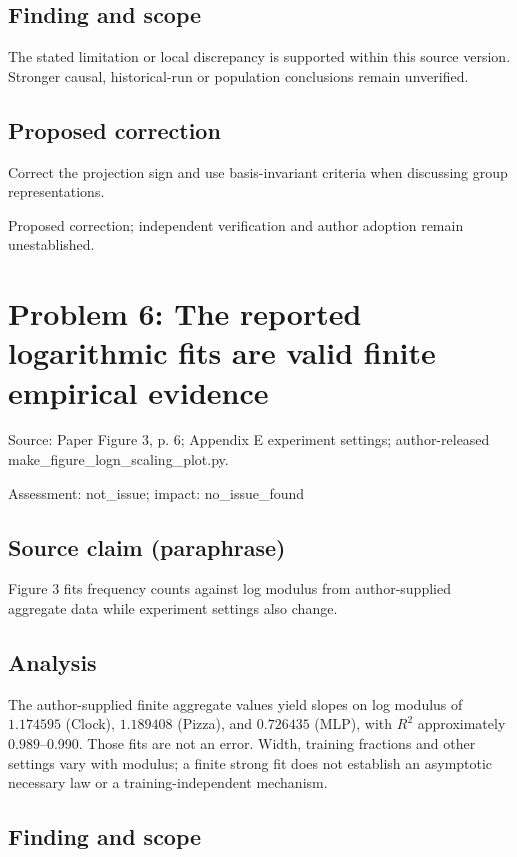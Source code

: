 \documentclass[11pt]{article}
\begin{document}
\subsection*{Finding and scope}

The stated limitation or local discrepancy is supported within this source version. Stronger causal, historical-run or population conclusions remain unverified.

\subsection*{Proposed correction}

Correct the projection sign and use basis-invariant criteria when discussing group representations.

Proposed correction; independent verification and author adoption remain unestablished.

\section*{Problem 6: The reported logarithmic fits are valid finite empirical evidence}

Source: Paper Figure 3, p. 6; Appendix E experiment settings; author-released make\_figure\_logn\_scaling\_plot.py.

Assessment: not\_issue; impact: no\_issue\_found

\subsection*{Source claim (paraphrase)}

Figure 3 fits frequency counts against log modulus from author-supplied aggregate data while experiment settings also change.

\subsection*{Analysis}

The author-supplied finite aggregate values yield slopes on log modulus of \(1.174595\) (Clock), \(1.189408\) (Pizza), and \(0.726435\) (MLP), with \(R^2\) approximately \(0.989\)–0.990. Those fits are not an error. Width, training fractions and other settings vary with modulus; a finite strong fit does not establish an asymptotic necessary law or a training-independent mechanism.

\subsection*{Finding and scope}
\end{document}

